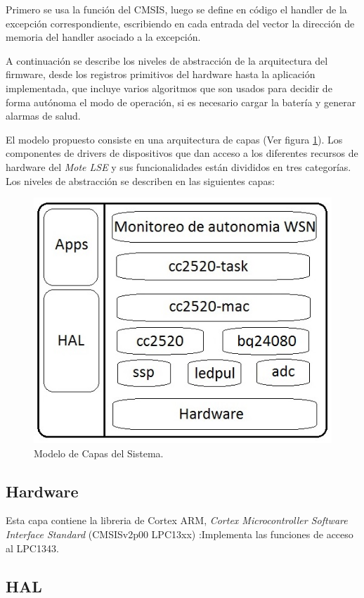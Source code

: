 {Primero se usa la función del CMSIS, luego se define en código el handler de la excepción correspondiente, escribiendo en cada entrada del vector la dirección de memoria del handler asociado a la excepción.

A continuación se describe los niveles de abstracción de la arquitectura del firmware, desde los registros primitivos del hardware hasta la aplicación implementada, que incluye varios algoritmos que son usados para decidir de forma autónoma el modo de operación, si es necesario cargar la batería y generar alarmas de salud.

El modelo propuesto consiste en una arquitectura de capas (Ver figura \ref{fig:capas}). Los componentes de drivers de dispositivos que dan acceso a los diferentes recursos de hardware del \textit{Mote LSE} y sus funcionalidades están divididos en tres categorías. Los niveles de abstracción se describen en las siguientes capas:

\begin{figure}[h!]
	\centering
    \includegraphics[width=.5\textwidth]{./Figures/arq.png}
    	\caption{Modelo de Capas del Sistema.}
	\label{fig:capas}
\end{figure}

\subsection{Hardware}
\label{subsec:hardlayer} 

Esta capa contiene la libreria de Cortex ARM, \textit{Cortex Microcontroller Software Interface Standard} \citep{arm} (CMSISv2p00 LPC13xx) :Implementa las funciones de acceso al LPC1343.	

\subsection{HAL}
\label{subsec:hal} 

}
